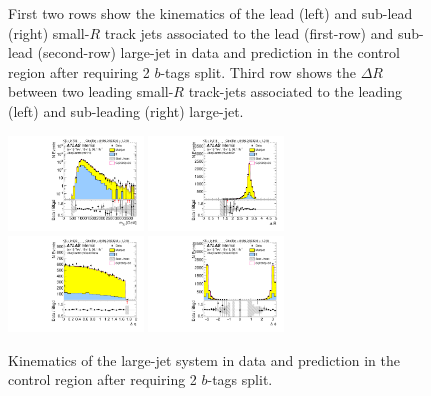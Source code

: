 \begin{figure}[htbp!]
\begin{center}
  \caption{First two rows show the kinematics of the lead (left) and sub-lead (right) small-$R$ track jets associated to the lead (first-row) and sub-lead (second-row) large-\R jet in data and prediction in the control region after requiring 2 $b$-tags split. Third row shows the $\Delta R$ between two leading small-$R$ track-jets associated to the leading (left) and sub-leading (right) large-\R jet.  }
  \label{fig:boosted-2bs-control-ak2}
\end{center}
\end{figure}


\begin{figure}[htbp!]
\begin{center}
\includegraphics[width=0.32\textwidth,angle=-90]{figures/boosted/Control/b77_TwoTag_split_Control_mHH_l_1.pdf}
\includegraphics[width=0.32\textwidth,angle=-90]{figures/boosted/Control/b77_TwoTag_split_Control_hCandDr.pdf}\\
\includegraphics[width=0.32\textwidth,angle=-90]{figures/boosted/Control/b77_TwoTag_split_Control_hCandDeta.pdf}
\includegraphics[width=0.32\textwidth,angle=-90]{figures/boosted/Control/b77_TwoTag_split_Control_hCandDphi.pdf}
  \caption{Kinematics of the large-\R jet system in data and prediction in the control region after requiring 2 $b$-tags split.  }
  \label{fig:boosted-2bs-control-ak10-system}
\end{center}
\end{figure}